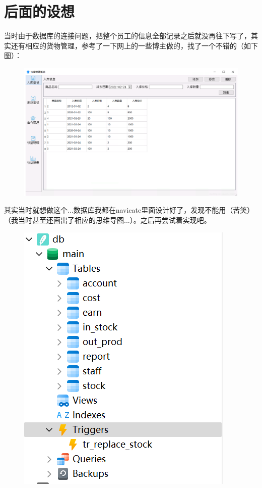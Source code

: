 \documentclass{article}
\begin{document}
\section{后面的设想}
当时由于数据库的连接问题，把整个员工的信息全部记录之后就没再往下写了，其实还有相应的货物管理，参考了一下网上的一些博主做的，找了一个不错的（如下图）：
\begin{figure}[H]
        \centering
        \includegraphics[scale=0.6]{设想.png}
        \label{fig:enter-label}
\end{figure}
其实当时就想做这个...数据库我都在navicate里面设计好了，发现不能用（苦笑）（我当时甚至还画出了相应的思维导图...）。之后再尝试着实现吧。
\begin{figure}[H]
        \centering
        \includegraphics[scale=0.6]{数据库.png}
        \label{fig:enter-label}
\end{figure}
\end{document}
